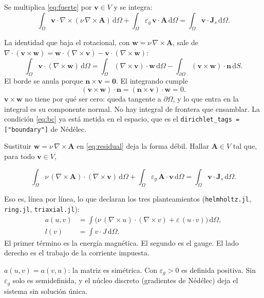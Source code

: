 \documentclass[11pt]{article}
\newcommand{\curl}{\nabla\times}
\newcommand{\nv}{\nu}
\newcommand{\eg}{\varepsilon_{g}}
\newcommand{\bd}{\partial\Omega}
\newcommand{\dV}{\,\mathrm{d}\Omega}
\newcommand{\dS}{\,\mathrm{d}S}
\newcommand{\eqbox}[2]{%
  \par\smallskip
  \noindent\colorbox{resultbg}{%
    \begin{minipage}{\dimexpr\linewidth-2\fboxsep\relax}
      \vspace{0.2em}
      \[ #1 \tag{#2} \]
      \vspace{-0.45em}
    \end{minipage}}%
  \par\smallskip
}
\begin{document}
Se multiplica \eqref{eq:fuerte} por \(\mathbf{v}\in V\) y se integra:
\begin{equation}
\int_{\Omega}\mathbf{v}\cdot\curl(\nv\,\curl\mathbf{A})\dV
+\int_{\Omega}\eg\,\mathbf{v}\cdot\mathbf{A}\dV
=\int_{\Omega}\mathbf{v}\cdot\mathbf{J}_{s}\dV.
\label{eq:residual}
\end{equation}

La identidad que baja el rotacional, con \(\mathbf{w}=\nv\,\curl\mathbf{A}\), sale de
\(\nabla\cdot(\mathbf{v}\times\mathbf{w})=\mathbf{w}\cdot(\curl\mathbf{v})-\mathbf{v}\cdot(\curl\mathbf{w})\):
\begin{equation}
\int_{\Omega}\mathbf{v}\cdot(\curl\mathbf{w})\dV
=\int_{\Omega}(\curl\mathbf{v})\cdot\mathbf{w}\dV
-\int_{\bd}(\mathbf{v}\times\mathbf{w})\cdot\mathbf{n}\dS.
\label{eq:partes}
\end{equation}
El borde se anula porque \(\mathbf{n}\times\mathbf{v}=\mathbf{0}\). El integrando cumple
\[
(\mathbf{v}\times\mathbf{w})\cdot\mathbf{n}=(\mathbf{n}\times\mathbf{v})\cdot\mathbf{w}=0.
\]
\(\mathbf{v}\times\mathbf{w}\) no tiene por qué ser cero: queda tangente a \(\bd\), y lo que entra en la integral es su componente normal. No hay integral de frontera que ensamblar. La condición \eqref{eq:bc} ya está metida en el espacio, que es el \texttt{dirichlet\_tags = ["boundary"]} de Nédélec.

Sustituir \(\mathbf{w}=\nv\,\curl\mathbf{A}\) en \eqref{eq:residual} deja la forma débil. Hallar \(\mathbf{A}\in V\) tal que, para todo \(\mathbf{v}\in V\),
\eqbox{
\int_{\Omega}\nv\,(\curl\mathbf{A})\cdot(\curl\mathbf{v})\dV
+\int_{\Omega}\eg\,\mathbf{A}\cdot\mathbf{v}\dV
=\int_{\Omega}\mathbf{v}\cdot\mathbf{J}_{s}\dV.
}{\(*\)}
Eso es, línea por línea, lo que declaran los tres planteamientos
(\texttt{helmholtz.jl}, \texttt{ring.jl}, \texttt{triaxial.jl}):
\begin{equation*}
\begin{aligned}
a(u,v)&=\int\bigl(\nv\,(\nabla\times u)\cdot(\nabla\times v)+\varepsilon\,(u\cdot v)\bigr)\,\mathrm{d}\Omega,\\
l(v)&=\int v\cdot J\,\mathrm{d}\Omega.
\end{aligned}
\end{equation*}
El primer término es la energía magnética. El segundo es el gauge. El lado derecho es el trabajo de la corriente impuesta.

\(a(u,v)=a(v,u)\): la matriz es simétrica. Con \(\eg>0\) es definida positiva. Sin \(\eg\) solo es semidefinida, y el núcleo discreto (gradientes de Nédélec) deja el sistema sin solución única.
\end{document}
